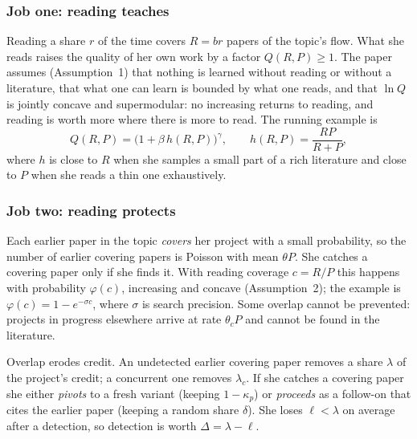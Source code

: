 \subsubsection{Job one: reading teaches}
Reading a share $r$ of the time covers $R=br$ papers of the topic's flow. What she reads raises the quality of her own work by a factor $Q(R,P)\ge 1$. The paper assumes (Assumption~1) that nothing is learned without reading or without a literature, that what one can learn is bounded by what one reads, and that $\ln Q$ is jointly concave and supermodular: no increasing returns to reading, and reading is worth more where there is more to read. The running example is
\[
Q(R,P)=\bigl(1+\beta\,h(R,P)\bigr)^{\gamma},\qquad h(R,P)=\frac{RP}{R+P},
\]
where $h$ is close to $R$ when she samples a small part of a rich literature and close to $P$ when she reads a thin one exhaustively.

\subsubsection{Job two: reading protects}
Each earlier paper in the topic \emph{covers} her project with a small probability, so the number of earlier covering papers is Poisson with mean $\theta P$. She catches a covering paper only if she finds it. With reading coverage $c=R/P$ this happens with probability $\varphi(c)$, increasing and concave (Assumption~2); the example is $\varphi(c)=1-e^{-\sigma c}$, where $\sigma$ is search precision. Some overlap cannot be prevented: projects in progress elsewhere arrive at rate $\theta_cP$ and cannot be found in the literature.

Overlap erodes credit. An undetected earlier covering paper removes a share $\lambda$ of the project's credit; a concurrent one removes $\lambda_c$. If she catches a covering paper she either \emph{pivots} to a fresh variant (keeping $1-\kappa_p$) or \emph{proceeds} as a follow-on that cites the earlier paper (keeping a random share $\delta$). She loses $\ell<\lambda$ on average after a detection, so detection is worth $\Delta=\lambda-\ell$.

